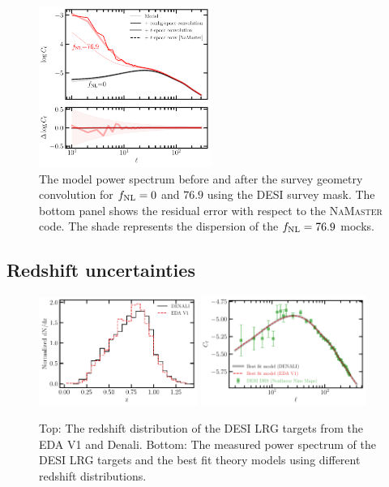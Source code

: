 \begin{figure}
    \centering
    \includegraphics[width=0.5\textwidth]{figures/cl_conv.pdf}
    \caption{The model power spectrum before and after the survey geometry convolution for $f_{\rm NL}=0$ and $76.9$ using the DESI survey mask. The bottom panel shows the residual error with respect to the \textsc{NaMaster} code. The shade represents the dispersion of the $f_{\rm NL}=76.9$ mocks.}
    \label{fig:window_conv}
\end{figure}

\subsection{Redshift uncertainties}\label{ssec:nzuncer}

\begin{figure}
\raggedleft
\includegraphics[width=0.46\textwidth]{figures/nz_lrg_eda.pdf}
\includegraphics[width=0.48\textwidth]{figures/cl_nz.pdf}\caption{Top: The redshift distribution of the DESI LRG targets from the EDA V1 and Denali. Bottom: The measured power spectrum of the DESI LRG targets and the best fit theory models using different redshift distributions.}\label{fig:cl_nz}
\end{figure}

